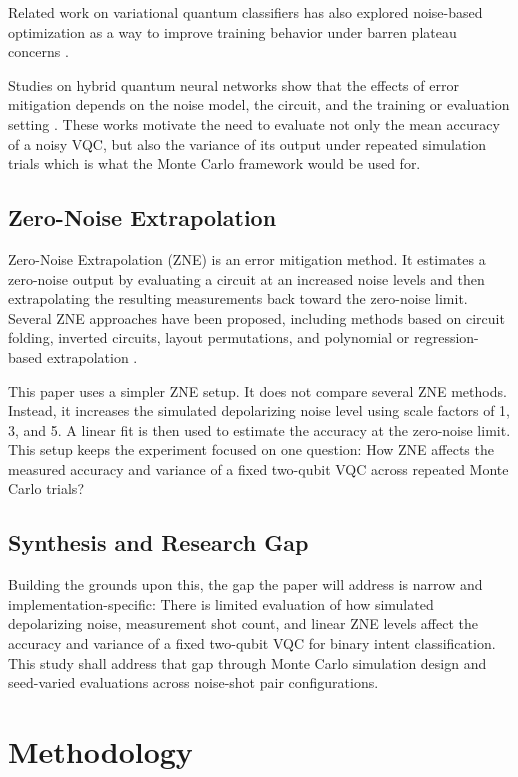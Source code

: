 \documentclass[conference]{IEEEtran}
\begin{document}
Related work on variational quantum classifiers has also explored noise-based
optimization as a way to improve training behavior under barren plateau concerns
\cite{b_lung2026}.

Studies on hybrid quantum neural networks show that the
effects of error mitigation depends on the noise model, the circuit, and the training or evaluation
setting \cite{b_njiki2026}. These works motivate the need to evaluate not only the mean accuracy
of a noisy VQC, but also the variance of its output under repeated simulation trials 
which is what the Monte Carlo framework would be used for.

\subsection{Zero-Noise Extrapolation}

Zero-Noise Extrapolation (ZNE) is an error mitigation method. It estimates a zero-noise output
by evaluating a circuit at an increased noise levels and then extrapolating the resulting measurements
back toward the zero-noise limit. Several ZNE approaches have been proposed, including methods
based on circuit folding, inverted circuits, layout permutations, and polynomial or regression-based
extrapolation \cite{b_koenig2024, b_sayapin2025, b_mohammadipour2025}.

This paper uses a simpler ZNE setup. It does not compare several ZNE
methods. Instead, it increases the simulated depolarizing noise level using scale
factors of 1, 3, and 5. A linear fit is then used to estimate the accuracy at the
zero-noise limit. This setup keeps the experiment focused on one question: How
ZNE affects the measured accuracy and variance of a fixed two-qubit VQC across
repeated Monte Carlo trials?

\subsection{Synthesis and Research Gap}

Building the grounds upon this, the gap the paper will address is narrow and implementation-specific: There is
limited evaluation of how simulated depolarizing noise, measurement shot count, and linear ZNE levels
affect the accuracy and variance of a fixed two-qubit VQC for binary intent classification. This
study shall address that gap through Monte Carlo simulation design and seed-varied
evaluations across noise-shot pair configurations.

\section{Methodology}
\end{document}
